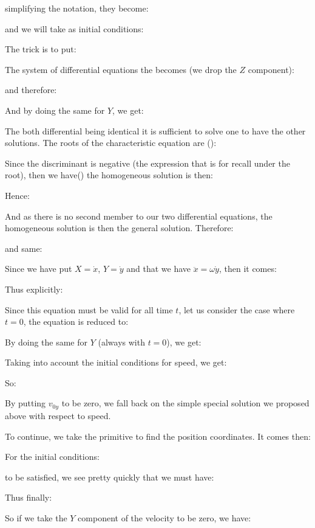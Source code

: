 	simplifying the notation, they become:
	
	and we will take as initial conditions:
	
	The trick is to put:
	
	The system of differential equations the becomes (we drop the $Z$ component):
	
	and therefore:
	
	And by doing the same for $Y$, we get:
	
	The both differential being identical it is sufficient to solve one to have the other solutions. The roots of the characteristic equation are ():
	
	Since the discriminant is negative (the expression that is for recall under the root), then we have() the homogeneous solution is then:
	
	Hence:
	
	And as there is no second member to our two differential equations, the homogeneous solution is then the general solution. Therefore:
	
	and same:
	
	Since we have put $X=\dot{x}$, $Y=\dot{y}$ and that we have $\ddot{x}=\omega\dot{y}$, then it comes:
	
	Thus explicitly:
	
	Since this equation must be valid for all time $t$, let us consider the case where $t = 0$, the equation is reduced to:
	
	By doing the same for $Y$ (always with $t = 0$), we get:
	
	Taking into account the initial conditions for speed, we get:
	
	So:
	
	\begin{tcolorbox}[title=Remark,colframe=black,arc=10pt]
	By putting $v_{0y}$ to be zero, we fall back on the simple special solution we proposed above with respect to speed.
	\end{tcolorbox}
	To continue, we take the primitive to find the position coordinates. It comes then:
	
	For the initial conditions:
	
	to be satisfied, we see pretty quickly that we must have:
	
	Thus finally:
	
	So if we take the $Y$ component of the velocity to be zero, we have:
	
